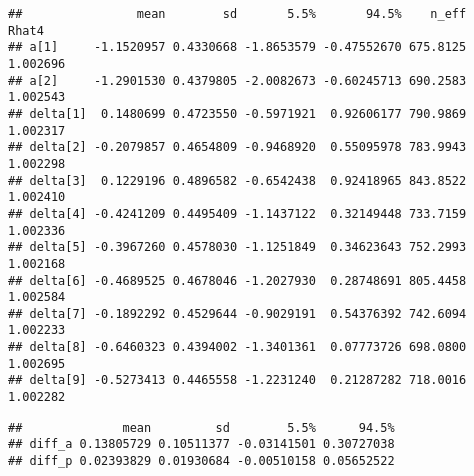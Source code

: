 \documentclass[]{article}
\newenvironment{Shaded}{\begin{snugshade}}{\end{snugshade}}
\newcommand{\KeywordTok}[1]{\textcolor[rgb]{0.13,0.29,0.53}{\textbf{{#1}}}}
\newcommand{\DataTypeTok}[1]{\textcolor[rgb]{0.13,0.29,0.53}{{#1}}}
\newcommand{\DecValTok}[1]{\textcolor[rgb]{0.00,0.00,0.81}{{#1}}}
\newcommand{\FloatTok}[1]{\textcolor[rgb]{0.00,0.00,0.81}{{#1}}}
\newcommand{\StringTok}[1]{\textcolor[rgb]{0.31,0.60,0.02}{{#1}}}
\newcommand{\OtherTok}[1]{\textcolor[rgb]{0.56,0.35,0.01}{{#1}}}
\newcommand{\NormalTok}[1]{{#1}}
\begin{document}
\begin{verbatim}
##                mean        sd       5.5%       94.5%    n_eff    Rhat4
## a[1]     -1.1520957 0.4330668 -1.8653579 -0.47552670 675.8125 1.002696
## a[2]     -1.2901530 0.4379805 -2.0082673 -0.60245713 690.2583 1.002543
## delta[1]  0.1480699 0.4723550 -0.5971921  0.92606177 790.9869 1.002317
## delta[2] -0.2079857 0.4654809 -0.9468920  0.55095978 783.9943 1.002298
## delta[3]  0.1229196 0.4896582 -0.6542438  0.92418965 843.8522 1.002410
## delta[4] -0.4241209 0.4495409 -1.1437122  0.32149448 733.7159 1.002336
## delta[5] -0.3967260 0.4578030 -1.1251849  0.34623643 752.2993 1.002168
## delta[6] -0.4689525 0.4678046 -1.2027930  0.28748691 805.4458 1.002584
## delta[7] -0.1892292 0.4529644 -0.9029191  0.54376392 742.6094 1.002233
## delta[8] -0.6460323 0.4394002 -1.3401361  0.07773726 698.0800 1.002695
## delta[9] -0.5273413 0.4465558 -1.2231240  0.21287282 718.0016 1.002282
\end{verbatim}

\begin{Shaded}
\end{Shaded}

\begin{verbatim}
##              mean         sd        5.5%      94.5%
## diff_a 0.13805729 0.10511377 -0.03141501 0.30727038
## diff_p 0.02393829 0.01930684 -0.00510158 0.05652522
\end{verbatim}

\begin{Shaded}
\end{Shaded}
\end{document}

